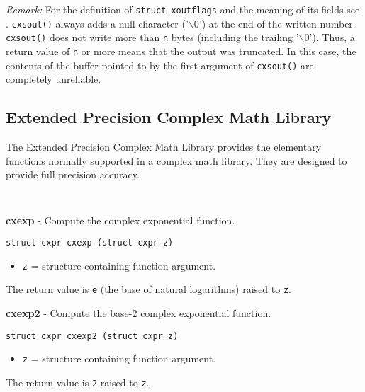 \documentclass{article}
\begin{document}
\textit{Remark:}
For the definition of \texttt{struct xoutflags} and the meaning of its fields
see . 
\texttt{cxsout()} always adds a null character ('$\backslash$0') at the end of 
the written number.
\texttt{cxsout()} does not write more than \texttt{n} bytes (including
the  trailing  '$\backslash$0'). Thus, a return value of \texttt{n} or more
means that the output was truncated. In this case, the contents of the 
buffer pointed to by the first argument of \texttt{cxsout()} are 
completely unreliable.

\hypertarget{toc15}{}
\subsection{Extended Precision Complex Math Library}
The Extended Precision Complex Math Library 
provides the elementary functions normally
supported in a complex math library. 
They are designed to provide full precision accuracy. 

\begin{verbatim}
   
\end{verbatim}

\textbf{cxexp} - Compute the complex exponential function.

\begin{verbatim}
struct cxpr cxexp (struct cxpr z)
\end{verbatim}

\begin{itemize}
\item \texttt{z} = structure containing function argument.
\end{itemize}

The return value is \texttt{e} (the base of natural logarithms) 
raised to \texttt{z}.


\hrulefill{}

\textbf{cxexp2} - Compute the base-2 complex exponential function.

\begin{verbatim}
struct cxpr cxexp2 (struct cxpr z)
\end{verbatim}

\begin{itemize}
\item \texttt{z} = structure containing function argument.
\end{itemize}

The return value is \texttt{2} raised to \texttt{z}.
\end{document}
